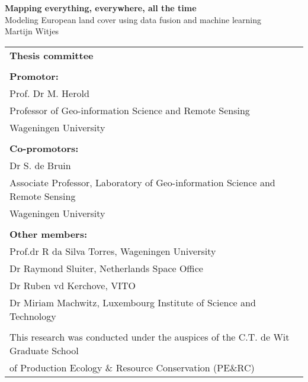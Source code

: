 \thispagestyle{empty}
\begin{center}
\Huge{\textbf{Mapping everything, everywhere, all the time}} \\
\Huge{Modeling European land cover using data fusion and machine learning} \\
\vspace*{1cm}
\vspace*{1cm}
\vspace*{\fill}
\large{Martijn Witjes}\\
\end{center}

\newpage
\thispagestyle{empty}
\vspace*{\fill}
\begin{tabular}{l}
    \textbf{Thesis committee}                                                                 \\  
                                                                                              \\  
    \textbf{Promotor:} \\  
    Prof. Dr M. Herold  \\  
    Professor of Geo-information Science and Remote Sensing\\  
    Wageningen University \\
    \\  
    \textbf{Co-promotors:}\\  
    Dr S. de Bruin \\  
    Associate Professor, Laboratory of Geo-information Science and Remote Sensing \\  
    Wageningen University \\  
    \\  

    \textbf{Other members:}                                                                   \\  
    Prof.dr R da Silva Torres, Wageningen University \\  
    Dr Raymond Sluiter, Netherlands Space Office \\  
    Dr Ruben vd Kerchove, VITO \\  
    Dr Miriam Machwitz, Luxembourg Institute of Science and Technology \\  \\  
    \small{This research was conducted under the auspices of the C.T. de Wit Graduate School} \\  
    \small{of Production Ecology \& Resource Conservation (PE$\&$RC)}                         \\  
\end{tabular}

